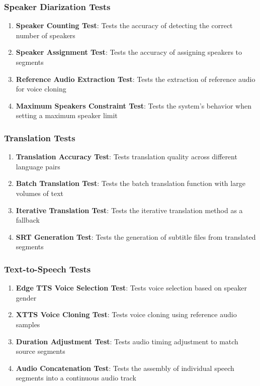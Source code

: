 \documentclass[11pt,a4paper]{article}
\begin{document}
\subsubsection{Speaker Diarization Tests}
\begin{enumerate}[label=SD\arabic*]
    \item \textbf{Speaker Counting Test}: Tests the accuracy of detecting the correct number of speakers
    \item \textbf{Speaker Assignment Test}: Tests the accuracy of assigning speakers to segments
    \item \textbf{Reference Audio Extraction Test}: Tests the extraction of reference audio for voice cloning
    \item \textbf{Maximum Speakers Constraint Test}: Tests the system's behavior when setting a maximum speaker limit
\end{enumerate}

\subsubsection{Translation Tests}
\begin{enumerate}[label=TR\arabic*]
    \item \textbf{Translation Accuracy Test}: Tests translation quality across different language pairs
    \item \textbf{Batch Translation Test}: Tests the batch translation function with large volumes of text
    \item \textbf{Iterative Translation Test}: Tests the iterative translation method as a fallback
    \item \textbf{SRT Generation Test}: Tests the generation of subtitle files from translated segments
\end{enumerate}

\subsubsection{Text-to-Speech Tests}
\begin{enumerate}[label=TTS\arabic*]
    \item \textbf{Edge TTS Voice Selection Test}: Tests voice selection based on speaker gender
    \item \textbf{XTTS Voice Cloning Test}: Tests voice cloning using reference audio samples
    \item \textbf{Duration Adjustment Test}: Tests audio timing adjustment to match source segments
    \item \textbf{Audio Concatenation Test}: Tests the assembly of individual speech segments into a continuous audio track
\end{enumerate}
\end{document}
